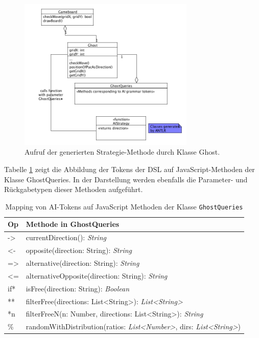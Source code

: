 \documentclass[conference]{IEEEtran}
\begin{document}
\begin{figure}[!htb]
\centering
\includegraphics[width=3.3in]{queries.png}
\caption{Aufruf der generierten Strategie-Methode durch Klasse Ghost.}
\label{ai_call}
\end{figure}

Tabelle \ref{token_method_mapping} zeigt die Abbildung der Tokens der DSL auf JavaScript-Methoden der Klasse GhostQueries. In der Darstellung werden ebenfalls die Parameter- und Rückgabetypen dieser Methoden aufgeführt.


\begin{table}[!htb]
\caption{Mapping von AI-Tokens auf JavaScript Methoden der Klasse \texttt{GhostQueries}}
\label{token_method_mapping}
\centering
\setlength\tabcolsep{1.5pt}
\begin{tabular}{|l||l|}

\hline
\textbf{Op} & \textbf{Methode in GhostQueries}\\

\hline
-> & currentDirection(): \emph{String} \\

\hline
<- & opposite(direction: String): \emph{String} \\

\hline
=> & alternative(direction: String): \emph{String} \\

\hline
<= & alternativeOpposite(direction: String): \emph{String} \\

\hline
if* & isFree(direction: String): \emph{Boolean} \\

\hline
** & filterFree(directions: List<String>): \emph{List<String>} \\

\hline
*n & filterFreeN(n: Number, directions: List<String>): \emph{String} \\

\hline
\% & randomWithDistribution(ratios: \emph{List<Number>}, dirs: \emph{List<String>})\\

\hline
\end{tabular}
\end{table}
\end{document}
